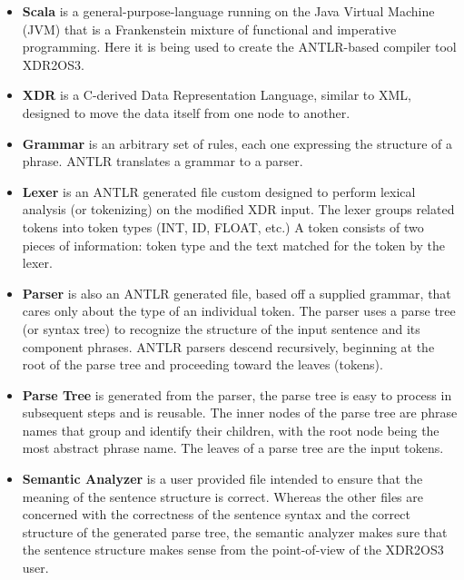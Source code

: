 \begin{itemize}
\item \textbf{Scala} is a general-purpose-language running on the Java Virtual Machine (JVM)
  that is a Frankenstein mixture of functional and imperative programming. Here it is being used
  to create the ANTLR-based compiler tool XDR2OS3.

\item \textbf{XDR} is a C-derived Data Representation Language, similar to XML, designed to move
  the data itself from one node to another.

\item \textbf{Grammar} is an arbitrary set of rules, each one expressing the structure of a
  phrase. ANTLR translates a grammar to a parser.

\item \textbf{Lexer} is an ANTLR generated file custom designed to perform lexical analysis (or
  tokenizing) on the modified XDR input. The lexer groups related tokens into token types (INT,
  ID, FLOAT, etc.) A token consists of two pieces of information: token type and the text
  matched for the token by the lexer.

\item \textbf{Parser} is also an ANTLR generated file, based off a supplied grammar, that cares
  only about the type of an individual token. The parser uses a parse tree (or syntax tree) to
  recognize the structure of the input sentence and its component phrases. ANTLR parsers descend
  recursively, beginning at the root of the parse tree and proceeding toward the leaves
  (tokens).

\item \textbf{Parse Tree} is generated from the parser, the parse tree is easy to process in
  subsequent steps and is reusable. The inner nodes of the parse tree are phrase names that
  group and identify their children, with the root node being the most abstract phrase name. The
  leaves of a parse tree are the input tokens.

\item \textbf{Semantic Analyzer} is a user provided file intended to ensure that the meaning of
  the sentence structure is correct. Whereas the other files are concerned with the correctness
  of the sentence syntax and the correct structure of the generated parse tree, the semantic
  analyzer makes sure that the sentence structure makes sense from the point-of-view of the
  XDR2OS3 user.


\end{itemize}
